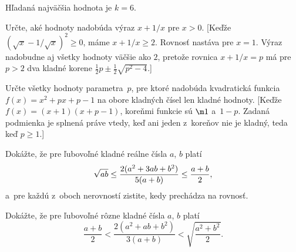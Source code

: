 {\zaver
Hľadaná najväčšia hodnota je $k=6$.

Určte, aké hodnoty nadobúda výraz $x+1/x$ pre $x>0$. [Keďže $(\sqrt x-1/\sqrt x)^2\ge0$, máme $x+1/x\ge2$. Rovnosť nastáva pre $x=1$. Výraz nadobudne aj všetky hodnoty väčšie ako $2$, pretože rovnica $x+1/x=p$ má pre $p>2$ dva kladné korene $\frac12p\pm\frac12\sqrt{p^2-4}$.]

Určte všetky hodnoty parametra~$p$, pre ktoré nadobúda kvadratická funkcia $f(x)=x^2+px+p-1$ na obore kladných čísel len kladné hodnoty. [Keďže $f(x)=(x+1)(x+p-1)$, koreňmi funkcie sú $\m1$ a~$1-p$. Zadaná podmienka je splnená práve vtedy, keď ani jeden z~koreňov nie je kladný, teda keď $p\ge1$.]

\D
Dokážte, že pre ľubovoľné kladné reálne čísla $a$, $b$ platí
$$
\sqrt{ab}\le{2(a^2+3ab+b^2)\over5(a+b)}\le{a+b\over2},
$$
a~pre každú z~oboch nerovností zistite, kedy prechádza na rovnosť.
\vpravo{[59--C--I--5]}

Dokážte, že pre ľubovoľné rôzne kladné čísla $a$, $b$ platí
$$
\frac{a+b}{2}<\frac{2(a^2+ab+b^2)}{3(a+b)}<\sqrt{\frac{a^2+b^2}{2}}.
$$
\vpravo{[58--C--I--6]}

}

